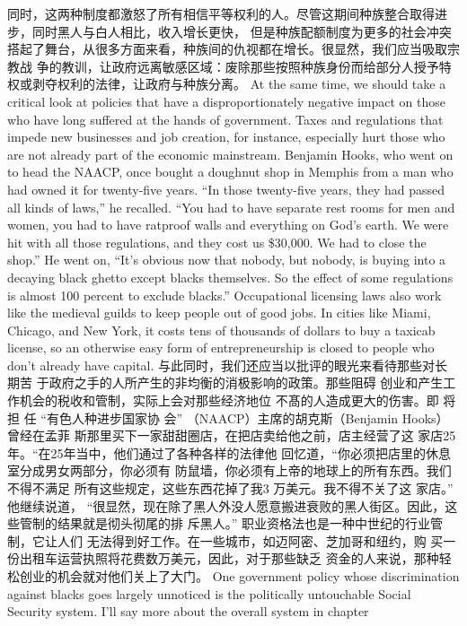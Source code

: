 \begin{paracol}{2}
同时，这两种制度都激怒了所有相信平等权利的人。尽管这期间种族整合取得进步，同时黑人与白人相比，收入增长更快，
但是种族配额制度为更多的社会冲突搭起了舞台，从很多方面来看，种族间的仇视都在增长。很显然，我们应当吸取宗教战
争的教训，让政府远离敏感区域：废除那些按照种族身份而给部分人授予特权或剥夺权利的法律，让政府与种族分离。
\switchcolumn*
At the same time, we should take a critical look at policies
that have a disproportionately negative impact on those who
have long suffered at the hands of government. Taxes and regulations that impede new businesses and job creation, for instance, especially hurt those who are not already part of the
economic mainstream. Benjamin Hooks, who went on to head
the NAACP, once bought a doughnut shop in Memphis from a
man who had owned it for twenty-five years. ``In those twenty-five years, they had passed all kinds of laws,'' he recalled. ``You
had to have separate rest rooms for men and women, you had to
have ratproof walls and everything on God's earth. We were hit
with all those regulations, and they cost us \$30,000. We had to
close the shop.'' He went on, ``It's obvious now that nobody, but
nobody, is buying into a decaying black ghetto except blacks
themselves. So the effect of some regulations is almost 100 percent to exclude blacks.'' Occupational licensing laws also work
like the medieval guilds to keep people out of good jobs. In
cities like Miami, Chicago, and New York, it costs tens of thousands of dollars to buy a taxicab license, so an otherwise easy
form of entrepreneurship is closed to people who don't already
have capital.
\switchcolumn
与此同时，我们还应当以批评的眼光来看待那些对长期苦
于政府之手的人所产生的非均衡的消极影响的政策。那些阻碍
创业和产生工作机会的税收和管制，实际上会对那些经济地位
不髙的人造成更大的伤害。即 将 担 任 “有色人种进步国家协
会” （NAACP）主席的胡克斯（Benjamin Hooks） 曾经在孟菲
斯那里买下一家甜甜圈店，在把店卖给他之前，店主经营了这
家店25年。“在25年当中，他们通过了各种各样的法律他
回忆道，“你必须把店里的休息室分成男女两部分，你必须有
防鼠墙，你必须有上帝的地球上的所有东西。我们不得不满足
所有这些规定，这些东西花掉了我3 万美元。我不得不关了这
家店。” 他继续说道， “很显然，现在除了黑人外没人愿意搬进衰败的黑人街区。因此，这些管制的结果就是彻头彻尾的排
斥黑人。” 职业资格法也是一种中世纪的行业管制，它让人们
无法得到好工作。在一些城市，如迈阿密、芝加哥和纽约，购
买一份出租车运营执照将花费数万美元，因此，对于那些缺乏
资金的人来说，那种轻松创业的机会就对他们关上了大门。
\switchcolumn*
One government policy whose discrimination against blacks
goes largely unnoticed is the politically untouchable Social Security system. I'll say more about the overall system in chapter

\end{paracol}
